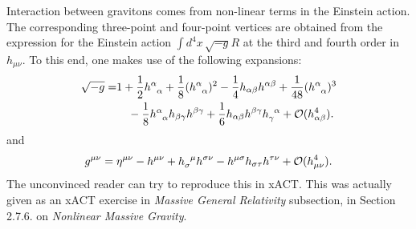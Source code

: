 \documentclass{book}
\theoremstyle{definition}
\newcommand{\nn}{\nonumber}
\newcommand{\al}{\alpha}
\newcommand{\be}{\beta}
\newcommand{\f}[2]{\frac{#1}{#2}}
\begin{document}
\begin{framed}
	Interaction between gravitons comes from non-linear terms in the Einstein action. The corresponding three-point and four-point vertices are obtained from the expression for the Einstein action $\int d^4x\, \sqrt{-g}R$ at the third and fourth order in $h_{\mu\nu}$. To this end, one makes use of the following expansions:
	\begin{align}
	\sqrt{-g}= &1 + \f{1}{2}\tensor{h}{^\al_\al} + \f{1}{8}(\tensor{h}{^\al_\al})^2 - \f{1}{4}h_{\al\be}h^{\al\be} + \f{1}{48}(\tensor{h}{^\al_\al})^3  \nn\\
	&\quad - \f{1}{8}\tensor{h}{^\al_\al}h_{\be\gamma}h^{\be\gamma} + \f{1}{6}h_{\al\be}h^{\be\gamma}\tensor{h}{_\gamma^\al} + \mathcal{O}(h^4_{\al\be}).
	\end{align} 
	and
	\begin{align}
	g^{\mu\nu} = \eta^{\mu\nu} - h^{\mu\nu} + \tensor{h}{_\sigma^\mu}h^{\sigma\nu} - h^{\mu\sigma}h_{\sigma\tau}h^{\tau\nu} +  \mathcal{O}(h^4_{\mu\nu}).
	\end{align}
	The unconvinced reader can try to reproduce this in xACT. This was actually given as an xACT exercise in \textit{Massive General Relativity} subsection, in Section 2.7.6. on \textit{Nonlinear Massive Gravity}. \\
	

\end{framed}
\end{document}
